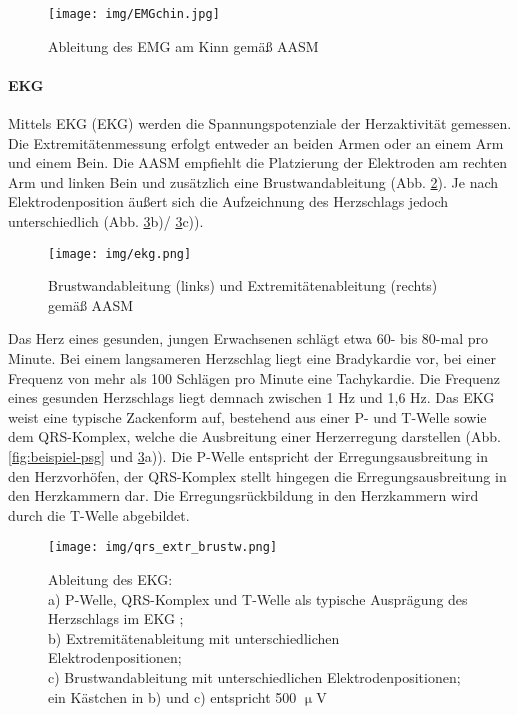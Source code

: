 \begin{figure}[H]
	\centering
	\texttt{[image: img/EMGchin.jpg]}
	\caption[Elektrodenpositionen des \acs{EMG}]{Ableitung des \acs{EMG} am Kinn gemäß \acs{AASM} \parencite{leroux_handbuch_2009}}
	\label{fig:emgchin}
\end{figure}

\paragraph{\acs{EKG}}
Mittels \acl{EKG} (\acs{EKG}) werden die Spannungspotenziale der Herzaktivität gemessen. Die Extremitätenmessung erfolgt entweder an beiden Armen oder an einem Arm und einem Bein. Die \acs{AASM} empfiehlt die Platzierung der Elektroden am rechten Arm und linken Bein und zusätzlich eine Brustwandableitung (Abb. \ref{fig:ekg}). Je nach Elektrodenposition äußert sich die Aufzeichnung des Herzschlags jedoch unterschiedlich (Abb. \ref{fig:qrs_extr_brustw}b)/ \ref{fig:qrs_extr_brustw}c)). \parencite{bamberger_1x1_2015, iber_aasm_2007}

\begin{figure}[H]
	\centering
	\texttt{[image: img/ekg.png]}
	\caption[Elektrodenpositionen des \acs{EKG}]{Brustwandableitung (links) und Extremitätenableitung (rechts) gemäß \acs{AASM} \parencite{leroux_handbuch_2009}}
	\label{fig:ekg}
\end{figure}

Das Herz eines gesunden, jungen Erwachsenen schlägt etwa 60- bis 80-mal pro Minute. Bei einem langsameren Herzschlag liegt eine Bradykardie vor, bei einer Frequenz von mehr als 100 Schlägen pro Minute eine Tachykardie. Die Frequenz eines gesunden Herzschlags liegt demnach zwischen 1 Hz und 1,6 Hz. Das \acs{EKG} weist eine typische Zackenform auf, bestehend aus einer P- und T-Welle sowie dem QRS-Komplex, welche die Ausbreitung einer Herzerregung darstellen (Abb. \ref{fig:beispiel-psg} und \ref{fig:qrs_extr_brustw}a)). Die P-Welle entspricht der Erregungsausbreitung in den Herzvorhöfen, der QRS-Komplex stellt hingegen die Erregungsausbreitung in den Herzkammern dar. Die Erregungsrückbildung in den Herzkammern wird durch die T-Welle abgebildet. \parencite{bamberger_1x1_2015, oresick_kania_ekg_2016}\\

\begin{figure}[H]
	\centering
	\texttt{[image: img/qrs\_extr\_brustw.png]}
	\caption[Ableitung des \acs{EKG}]{Ableitung des \acs{EKG}:\\a) P-Welle, QRS-Komplex und T-Welle als typische Ausprägung des Herzschlags im \acs{EKG} \parencite{oresick_kania_ekg_2016};\\b) Extremitätenableitung mit unterschiedlichen Elektrodenpositionen;\\c) Brustwandableitung mit unterschiedlichen Elektrodenpositionen;\\ein Kästchen in b) und c) entspricht 500 $\upmu$V \parencite{bamberger_1x1_2015}}
	\label{fig:qrs_extr_brustw}
\end{figure}


